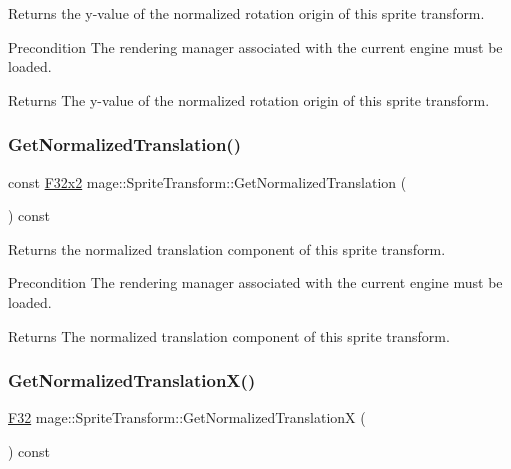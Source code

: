 Returns the y-\/value of the normalized rotation origin of this sprite transform.

\begin{DoxyPrecond}{Precondition}
The rendering manager associated with the current engine must be loaded. 
\end{DoxyPrecond}
\begin{DoxyReturn}{Returns}
The y-\/value of the normalized rotation origin of this sprite transform. 
\end{DoxyReturn}
\hypertarget{classmage_1_1_sprite_transform_af77e09289e47b1a5215acec31085f9b3}{}\label{classmage_1_1_sprite_transform_af77e09289e47b1a5215acec31085f9b3} 
\subsubsection{\texorpdfstring{Get\+Normalized\+Translation()}{GetNormalizedTranslation()}}
{\footnotesize\ttfamily const \hyperlink{namespacemage_aa87237ad091f5cd7da612b8523fc108f}{F32x2} mage\+::\+Sprite\+Transform\+::\+Get\+Normalized\+Translation (\begin{DoxyParamCaption}{ }\end{DoxyParamCaption}) const}

Returns the normalized translation component of this sprite transform.

\begin{DoxyPrecond}{Precondition}
The rendering manager associated with the current engine must be loaded. 
\end{DoxyPrecond}
\begin{DoxyReturn}{Returns}
The normalized translation component of this sprite transform. 
\end{DoxyReturn}
\hypertarget{classmage_1_1_sprite_transform_a31bf43cccaf564054930d80e229ebef3}{}\label{classmage_1_1_sprite_transform_a31bf43cccaf564054930d80e229ebef3} 
\subsubsection{\texorpdfstring{Get\+Normalized\+Translation\+X()}{GetNormalizedTranslationX()}}
{\footnotesize\ttfamily \hyperlink{namespacemage_aa97e833b45f06d60a0a9c4fc22ae02c0}{F32} mage\+::\+Sprite\+Transform\+::\+Get\+Normalized\+TranslationX (\begin{DoxyParamCaption}{ }\end{DoxyParamCaption}) const}

